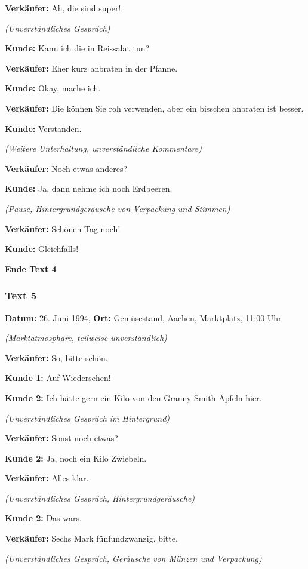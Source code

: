 \documentclass[
]{article}
\begin{document}
\textbf{Verkäufer:} Ah, die sind super!

\emph{(Unverständliches Gespräch)}

\textbf{Kunde:} Kann ich die in Reissalat tun?

\textbf{Verkäufer:} Eher kurz anbraten in der Pfanne.

\textbf{Kunde:} Okay, mache ich.

\textbf{Verkäufer:} Die können Sie roh verwenden, aber ein bisschen
anbraten ist besser.

\textbf{Kunde:} Verstanden.

\emph{(Weitere Unterhaltung, unverständliche Kommentare)}

\textbf{Verkäufer:} Noch etwas anderes?

\textbf{Kunde:} Ja, dann nehme ich noch Erdbeeren.

\emph{(Pause, Hintergrundgeräusche von Verpackung und Stimmen)}

\textbf{Verkäufer:} Schönen Tag noch!

\textbf{Kunde:} Gleichfalls!

\textbf{Ende Text 4}

\subsubsection{\texorpdfstring{\textbf{Text 5}}{Text 5}}\label{text-5}

\textbf{Datum:} 26. Juni 1994, \textbf{Ort:} Gemüsestand, Aachen,
Marktplatz, 11:00 Uhr

\emph{(Marktatmosphäre, teilweise unverständlich)}

\textbf{Verkäufer:} So, bitte schön.

\textbf{Kunde 1:} Auf Wiedersehen!

\textbf{Kunde 2:} Ich hätte gern ein Kilo von den Granny Smith Äpfeln
hier.

\emph{(Unverständliches Gespräch im Hintergrund)}

\textbf{Verkäufer:} Sonst noch etwas?

\textbf{Kunde 2:} Ja, noch ein Kilo Zwiebeln.

\textbf{Verkäufer:} Alles klar.

\emph{(Unverständliches Gespräch, Hintergrundgeräusche)}

\textbf{Kunde 2:} Das war\textquotesingle s.

\textbf{Verkäufer:} Sechs Mark fünfundzwanzig, bitte.

\emph{(Unverständliches Gespräch, Geräusche von Münzen und Verpackung)}
\end{document}
